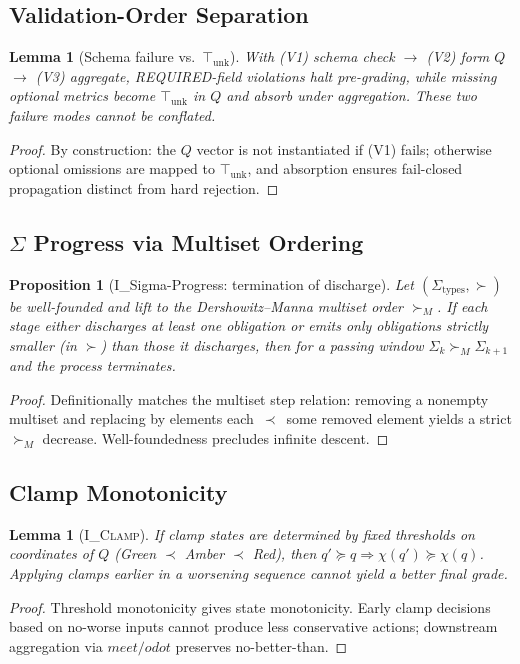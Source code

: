 \documentclass[11pt]{article}
\theoremstyle{plain}
\newtheorem{lemma}[theorem]{Lemma}
\newtheorem{proposition}[theorem]{Proposition}
\theoremstyle{definition}
\theoremstyle{remark}
\def\Q{Q}%
\def\Sig{\Sigma}%
\def\vmeet{meet}%
\def\hplus{odot}%
\def\ISigma{I\_Sigma-Progress}%
\DeclareRobustCommand{\Q}{\texorpdfstring{\ensuremath{\mathcal{Q}}}{Q}}     %
\DeclareRobustCommand{\Sig}{\texorpdfstring{\ensuremath{\Sigma}}{\Sigma}}   %
\newcommand{\unk}{\top_{\mathrm{unk}}}         %
\newcommand{\vmeet}{\wedge}                    %
\newcommand{\hplus}{\odot}                     %
\newcommand{\geqQ}{\succeq}
\DeclareRobustCommand{\ISigma}{%
  \texorpdfstring{\textsc{I\_\ensuremath{\Sigma}-Progress}}{\textsc{I\_Sigma-Progress}}%
}
\newcommand{\IClamp}{\textsc{I\_Clamp}}
\def\Q{Q}%
\def\Sig{\Sigma}%
\def\vmeet{meet}%
\def\hplus{odot}%
\begin{document}
\subsection{Validation-Order Separation}
\begin{lemma}[Schema failure vs.\ $\unk$]
\label{lem:app-validation}
With (V1) schema check $\to$ (V2) form $\Q$ $\to$ (V3) aggregate, REQUIRED-field violations halt \emph{pre}-grading, while missing optional metrics become $\unk$ in $\Q$ and absorb under aggregation. These two failure modes cannot be conflated.
\end{lemma}
\begin{proof}
By construction: the $\Q$ vector is not instantiated if (V1) fails; otherwise optional omissions are mapped to $\unk$, and absorption ensures fail-closed propagation distinct from hard rejection.
\end{proof}

\subsection{$\Sig$ Progress via Multiset Ordering}
\begin{proposition}[\ISigma: termination of discharge]
\label{prop:app-sigma}
Let $(\Sigma_{\text{types}},\succ)$ be well-founded and lift to the Dershowitz–Manna multiset order $\succ_M$. If each stage either discharges at least one obligation or emits only obligations strictly smaller (in $\succ$) than those it discharges, then for a passing window $\Sigma_k \succ_M \Sigma_{k+1}$ and the process terminates.
\end{proposition}
\begin{proof}
Definitionally matches the multiset step relation: removing a nonempty multiset and replacing by elements each $\,\prec\,$ some removed element yields a strict $\succ_M$ decrease. Well-foundedness precludes infinite descent.
\end{proof}

\subsection{Clamp Monotonicity}
\begin{lemma}[\IClamp]
\label{lem:app-clamp}
If clamp states are determined by fixed thresholds on coordinates of $\Q$ (Green $\prec$ Amber $\prec$ Red), then $q'\geqQ q \Rightarrow \chi(q') \succeq \chi(q)$. Applying clamps earlier in a worsening sequence cannot yield a better final grade.
\end{lemma}
\begin{proof}
Threshold monotonicity gives state monotonicity. Early clamp decisions based on no-worse inputs cannot produce less conservative actions; downstream aggregation via $\vmeet/\hplus$ preserves no-better-than.
\end{proof}
\end{document}
